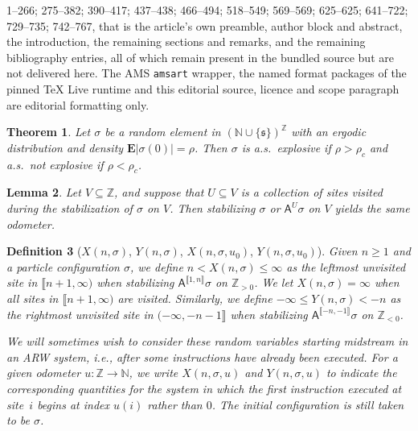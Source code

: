 \documentclass[10pt,a4paper]{amsart}
\newtheorem{theorem}{Theorem}[section]
\newtheorem{lemma}[theorem]{Lemma}
\newtheorem{definition}[theorem]{Definition}
\begin{document}
1--266; 275--382; 390--417; 437--438; 466--494; 518--549; 569--569; 625--625; 641--722; 729--735; 742--767, that is the article's own preamble, author block and abstract, the introduction, the remaining sections and remarks, and the remaining bibliography entries, all of which remain present in the bundled source but are not delivered here. The AMS \texttt{amsart} wrapper, the named format packages of the pinned TeX Live runtime and this editorial source, licence and scope paragraph are editorial formatting only.\par\smallskip
\setcounter{section}{1}
\setcounter{equation}{0}
\setcounter{theorem}{0}
\begin{theorem}%
\label{thm:explosive}
Let $\sigma $ be a random element in
$(\mathbb{N}\cup \{\mathfrak{s}\})^{\mathbb{Z}}$ with an ergodic distribution
and density $\mathbf{E}\mathopen{\lvert }\sigma (0)\mathclose{\rvert } = \rho $. Then $\sigma $ is a.s.\ explosive
if $\rho > \rho _{c}$ and a.s.\ not explosive if $\rho < \rho _{c}$.
\end{theorem}

\setcounter{section}{2}
\setcounter{equation}{0}
\setcounter{theorem}{0}
\begin{lemma}%
\label{lem:preemptive}
Let $V\subseteq \mathbb{Z}$, and suppose that $U\subseteq V$ is a collection
of sites visited during the stabilization of $\sigma $ on $V$. Then stabilizing
$\sigma $ or $\mathsf{A}^{U}\sigma $ on $V$ yields the same odometer.
\end{lemma}

\setcounter{section}{2}
\setcounter{equation}{0}
\setcounter{theorem}{1}
\begin{definition}[$X(n, \sigma )$, $Y(n, \sigma )$, $X(n, \sigma ,u_{0})$, $Y(n,\sigma ,u_{0})$]
\label{defn2.2}
Given $n\ge 1$ and a particle configuration $\sigma $, we define
$n<X(n, \sigma )\leq \infty $ as the leftmost unvisited site in
$\llbracket n+1,\infty )$ when stabilizing
$\mathsf{A}^{\mathopen{\llbracket }1,n \mathclose{\rrbracket }}\sigma $ on $\mathbb{Z}_{>0}$. We let
$X(n,\sigma )=\infty $ when all sites in $\llbracket n+1,\infty )$ are
visited. Similarly, we define $-\infty \le Y(n, \sigma ) < -n$ as the rightmost
unvisited site in $(-\infty ,-n-1\rrbracket $ when stabilizing
$\mathsf{A}^{\mathopen{\llbracket }-n,-1\mathclose{\rrbracket }}\sigma $ on $\mathbb{Z}_{<0}$.

We will sometimes wish to consider these random variables starting midstream
in an ARW system, i.e., after some instructions have already been executed.
For a given odometer $u \colon \mathbb{Z}\to \mathbb{N}$, we write
$X(n, \sigma , u)$ and $Y(n, \sigma , u)$ to indicate the corresponding
quantities for the system in which the first instruction executed at site~$i$
begins at index $u(i)$ rather than $0$. The initial configuration is still
taken to be $\sigma $.
\end{definition}
\end{document}
